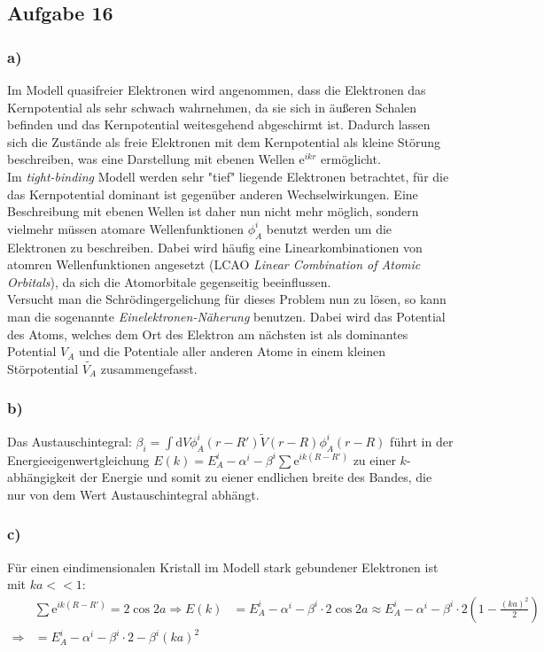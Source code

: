 \subsection*{Aufgabe 16}
\subsubsection*{a)}
Im Modell quasifreier Elektronen wird angenommen, dass die Elektronen das Kernpotential als sehr schwach wahrnehmen, da sie sich in äußeren Schalen befinden und das Kernpotential weitesgehend abgeschirmt ist. Dadurch lassen sich die Zustände als freie Elektronen mit dem Kernpotential als kleine Störung beschreiben, was eine Darstellung mit ebenen Wellen $\mathrm{e}^{ikr}$ ermöglicht.\\
Im \textit{tight-binding} Modell werden sehr "tief" liegende Elektronen betrachtet, für die das Kernpotential dominant ist gegenüber anderen Wechselwirkungen. Eine Beschreibung mit ebenen Wellen ist daher nun nicht mehr möglich, sondern vielmehr müssen atomare Wellenfunktionen $\phi_A^i$ benutzt werden um die Elektronen zu beschreiben. Dabei wird häufig eine Linearkombinationen von atomren Wellenfunktionen angesetzt (LCAO \textit{Linear Combination of Atomic Orbitals}), da sich die Atomorbitale gegenseitig beeinflussen.\\
Versucht man die Schrödingergelichung für dieses Problem nun zu lösen, so kann man die sogenannte \textit{Einelektronen-Näherung} benutzen. Dabei wird das Potential des Atoms, welches dem Ort des Elektron am nächsten ist als dominantes Potential $V_A$ und die Potentiale aller anderen Atome in einem kleinen Störpotential $\tilde{V_A}$ zusammengefasst.\\

\subsubsection*{b)}
Das Austauschintegral: $ \beta_i = \int \mathrm{d}V \phi_A^i(r-R')\tilde{V}(r-R)\phi_A^i(r-R)$ führt in der Energieeigenwertgleichung $E(k) = E_A^i -\alpha^i-\beta^i\sum \mathrm{e}^{ik(R-R')}$ zu einer $k$-abhängigkeit der Energie und somit zu eiener endlichen breite des Bandes, die nur von dem Wert Austauschintegral abhängt.
\subsubsection*{c)}
Für einen eindimensionalen Kristall im Modell stark gebundener Elektronen ist mit $ka<<1$:
\begin{align*}
&\sum \mathrm{e}^{ik(R-R')} = 2\cos{2a}
\Rightarrow E(k) &= E_A^i -\alpha^i-\beta^i\cdot2\cos{2a} \approx E_A^i -\alpha^i-\beta^i\cdot2\left(1-\frac{(ka)^2}{2}\right)\\
\Rightarrow &= E_A^i -\alpha^i-\beta^i\cdot2-\beta^i(ka)^2
\end{align*}

